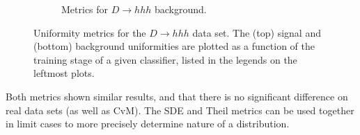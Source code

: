 \begin{figure}[h]
\begin{subfigure}[b]{0.95\textwidth}
			\caption{Metrics for $D \to hhh$ background.}
		\end{subfigure}
		\caption{Uniformity metrics for the $D \to hhh$ data set. The (top) signal and (bottom) background uniformities are plotted as a function of the training stage of a given classifier, listed in the legends on the leftmost plots. \label{fig:d2hhhsdetheil}}
\end{figure}

Both metrics shown similar results, and that there is no significant difference on real data sets (as well as CvM).
The SDE and Theil metrics can be used together in limit cases to more precisely determine nature of a distribution.
